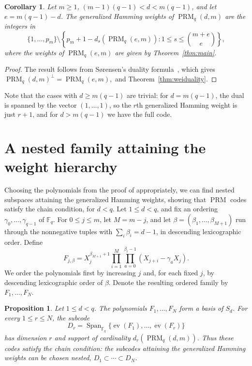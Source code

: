 \documentclass[11pt]{amsart}
\newtheorem{proposition}[theorem]{Proposition}
\newtheorem{corollary}[theorem]{Corollary}
\theoremstyle{definition}
\newcommand{\F}{\mathbb F}
\newcommand{\ev}{\operatorname{ev}}
\newcommand{\PRM}{\operatorname{PRM}}
\newcommand{\Span}{\operatorname{Span}}
\numberwithin{equation}{section}
\begin{document}
\begin{corollary}\label{cor:highdegree}
Let $m\ge1$, $(m-1)(q-1)<d<m(q-1)$, and let $e=m(q-1)-d$. The generalized Hamming weights of
$\PRM_q(d,m)$ are the integers in
\[
 \{1,\ldots,p_m\}\setminus
 \left\{p_m+1-d_s(\PRM_q(e,m)):
                  1\le s\le\binom{m+e}{e}\right\},
\]
where the weights of $\PRM_q(e,m)$ are
given by Theorem~\ref{thm:main}.
\end{corollary}
\begin{proof}
The result follows from S{\o}rensen's duality formula~\cite[Thm.~2]{Sorensen}, which gives
\(
 \PRM_q(d,m)^\perp=\PRM_q(e,m),
\)
and Theorem~\ref{thm:weiduality}.
\end{proof}
Note that the cases with $d\geq m(q-1)$ are trivial: for $d=m(q-1)$, the dual is spanned by the vector $(1,\dots,1)$, so the $r$th generalized Hamming weight is just $r+1$, and for $d>m(q-1)$ we have the full code. 

\section{A nested family attaining the weight hierarchy}\label{sec:chain}
Choosing the polynomials from the proof of \cite[Thm. 2.3]{BDG22} appropriately, we can find nested subspaces attaining the generalized Hamming weights, showing that $\PRM$ codes satisfy the chain condition, for $d<q$.
Let $1\le d<q$, and fix an ordering $\gamma_0,\ldots,\gamma_{q-1}$
of $\F_q$. For $0\le j\le m$, let $M=m-j$, and let
$\beta=(\beta_1,\ldots,\beta_{M+1})$ run through the nonnegative
tuples with $\sum_i\beta_i=d-1$, in descending lexicographic order.
Define
\begin{equation}\label{eq:newtonbasis}
 F_{j,\beta}
 =X_j^{\beta_{M+1}+1}
  \prod_{i=1}^{M}\prod_{a=0}^{\beta_i-1}
              (X_{j+i}-\gamma_aX_j).
\end{equation}
We order the polynomials first by increasing $j$ and, for each
fixed $j$, by descending lexicographic order of $\beta$.
Denote the resulting ordered family by $F_1,\ldots,F_N$.

\begin{proposition}\label{prop:newton}
Let $1\leq d <q$. The polynomials $F_1,\ldots,F_N$ form a basis of $S_d$. For every
$1\le r\le N$, the subcode
\[
 D_r=\Span_{\F_q}\{\ev(F_1),\ldots,\ev(F_r)\}
\]
has dimension $r$ and support of cardinality
$d_r(\PRM_q(d,m))$. Thus these codes satisfy the \emph{chain
condition}: the subcodes attaining the generalized Hamming weights
can be chosen nested, $D_1\subset\cdots\subset D_N$.
\end{proposition}
\end{document}
